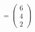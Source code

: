 \documentclass[preview]{standalone}
\begin{document}
\begin{align*}
= \begin{pmatrix} 6 \\ 4 \\ 2 \end{pmatrix}
\end{align*}
\end{document}
